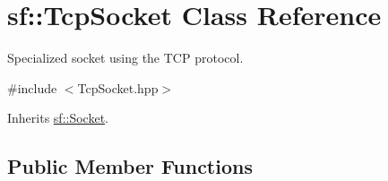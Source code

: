 \hypertarget{classsf_1_1_tcp_socket}{\section{sf\+:\+:Tcp\+Socket Class Reference}
\label{classsf_1_1_tcp_socket}
}


Specialized socket using the T\+C\+P protocol.  




{\ttfamily \#include $<$Tcp\+Socket.\+hpp$>$}



Inherits \hyperlink{classsf_1_1_socket}{sf\+::\+Socket}.

\subsection*{Public Member Functions}
